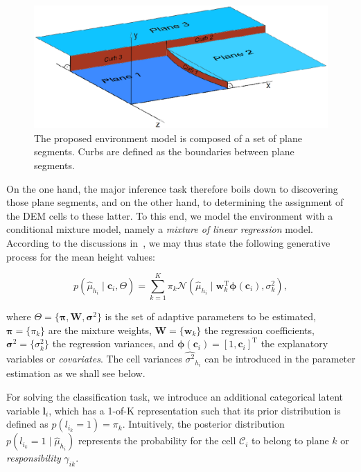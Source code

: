 \begin{figure}[t]
\centering
\includegraphics[width=\columnwidth]{fig/model.eps}
\caption{The proposed environment model is composed of a set of plane segments.
Curbs are defined as the boundaries between plane segments.}
\label{fig:model}
\end{figure}

On the one hand, the major inference task therefore boils down to discovering
those plane segments, and on the other hand, to determining the assignment of
the DEM cells to these latter. To this end, we model the environment with a
conditional mixture model, namely a \emph{mixture of linear regression} model.
According to the discussions in~\cite{bishop06pattern}, we may thus state the
following generative process for the mean height values:

\begin{equation}
\label{eqn:mixture}
p(\hat{\mu}_{h_i}\mid\mathbf{c}_i, \Theta)=\sum_{k=1}^K\pi_k\mathcal{N}
(\hat{\mu}_{h_i}\mid\mathbf{w}_k^\text{T}\boldsymbol{\phi}(\mathbf{c}_i),
\sigma^2_k),
\end{equation}

where $\Theta=\{\boldsymbol{\pi},\mathbf{W},\boldsymbol{\sigma}^2\}$ is the set
of adaptive parameters to be estimated, $\boldsymbol{\pi}=\{\pi_k\}$ are the
mixture weights, $\mathbf{W}=\{\mathbf{w}_k\}$ the regression coefficients,
$\boldsymbol{\sigma}^2=\{\sigma^2_k\}$ the regression variances, and
$\boldsymbol{\phi}(\mathbf{c}_i)=[1,\mathbf{c}_i]^\text{T}$ the explanatory
variables or \emph{covariates}. The cell variances $\hat{\sigma^2}_{h_i}$ can
be introduced in the parameter estimation as we shall see below.

For solving the classification task, we introduce an additional categorical
latent variable $\mathbf{l}_i$, which has a 1-of-K representation such that
its prior distribution is defined as $p(l_{i_k}=1)=\pi_k$. Intuitively, the
posterior distribution $p(l_{i_k}=1\mid\hat{\mu}_{h_i})$ represents the
probability for the cell $\mathcal{C}_i$ to belong to plane $k$ or
\emph{responsibility} $\gamma_{ik}$.


